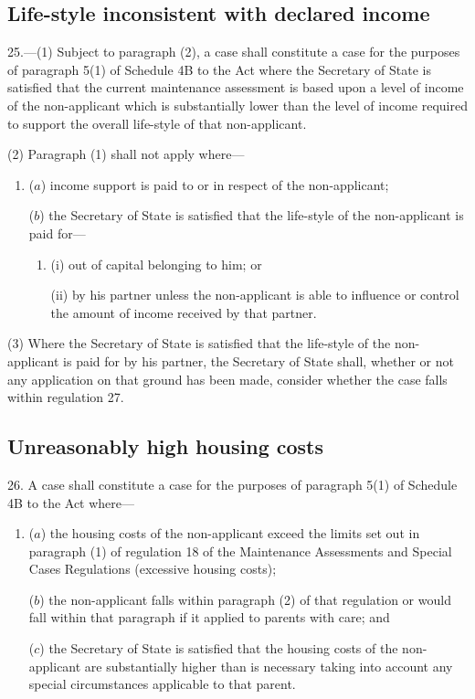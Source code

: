 \documentclass[a4paper]{article}
\begin{document}
\subsection[25. Life-style inconsistent with declared income]{Life-style inconsistent with declared income}

25.—(1) Subject to paragraph (2), a case shall constitute a case for the purposes of paragraph 5(1) of Schedule 4B to the Act where the Secretary of State is satisfied that the current maintenance assessment is based upon a level of income of the non-applicant which is substantially lower than the level of income required to support the overall life-style of that non-applicant.

(2) Paragraph (1) shall not apply where—
\begin{enumerate}\item[]
($a$) income support is paid to or in respect of the non-applicant;

($b$) the Secretary of State is satisfied that the life-style of the non-applicant is paid for—
\begin{enumerate}\item[]
(i) out of capital belonging to him; or

(ii) by his partner unless the non-applicant is able to influence or control the amount of income received by that partner.
\end{enumerate}
\end{enumerate}

(3) Where the Secretary of State is satisfied that the life-style of the non-applicant is paid for by his partner, the Secretary of State shall, whether or not any application on that ground has been made, consider whether the case falls within regulation 27.

\subsection[26. Unreasonably high housing costs]{Unreasonably high housing costs}

26.  A case shall constitute a case for the purposes of paragraph 5(1) of Schedule 4B to the Act where—
\begin{enumerate}\item[]
($a$) the housing costs of the non-applicant exceed the limits set out in paragraph (1) of regulation 18 of the Maintenance Assessments and Special Cases Regulations (excessive housing costs);

($b$) the non-applicant falls within paragraph (2) of that regulation or would fall within that paragraph if it applied to parents with care; and

($c$) the Secretary of State is satisfied that the housing costs of the non-applicant are substantially higher than is necessary taking into account any special circumstances applicable to that parent.
\end{enumerate}
\end{document}
